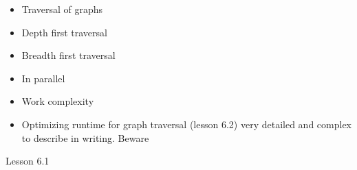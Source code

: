 \begin{itemize}
	\item Traversal of graphs
	\item Depth first traversal
	\item Breadth first traversal
	\item In parallel
	\item Work complexity
	\item Optimizing runtime for graph traversal (lesson 6.2) very detailed and complex to describe in writing. Beware
\end{itemize}

Lesson 6.1